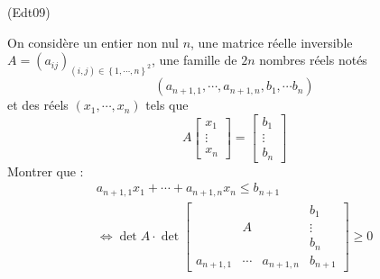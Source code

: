 \begin{tiny}(Edt09)\end{tiny}
On considère un entier non nul  $n$,  une matrice r{\'e}elle inversible $A=(a_{ij})_{(i,j)\in \left\{ 1,\cdots
,n\right\} ^{2}}$, une famille de $2n$ nombres réels notés 
\begin{displaymath}
(a_{n+1,1},\cdots ,a_{n+1,n},b_{1},\cdots b_{n})
\end{displaymath}
et des réels $(x_{1},\cdots ,x_{n})$ tels que 
\begin{displaymath}
A
\begin{bmatrix}
x_{1} \\
\vdots  \\
x_{n}
\end{bmatrix}
 =
\begin{bmatrix}
b_{1} \\
\vdots  \\
b_{n}
\end{bmatrix}
\end{displaymath}
Montrer que  :
\begin{multline*}
a_{n+1,1}x_{1}+\cdots +a_{n+1,n}x_{n} \leq b_{n+1} \\
\Leftrightarrow 
\det A\cdot \det 
\begin{bmatrix}
&  &  & b_{1} \\
& A &  & \vdots  \\
&  &  & b_{n} \\
a_{n+1,1} & \cdots  & a_{n+1,n} & b_{n+1}
\end{bmatrix}
 \geq 0
\end{multline*}

